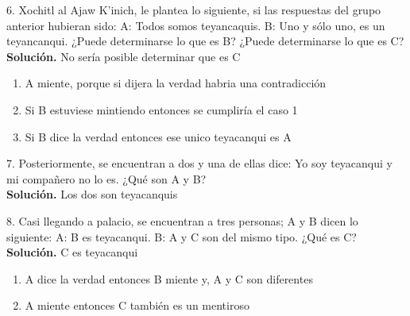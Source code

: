 6. Xochitl al Ajaw K’inich, le plantea lo siguiente, si las respuestas del grupo anterior hubieran sido: A: Todos somos teyancaquis. B: Uno y sólo uno, es un teyancanqui. ¿Puede determinarse lo que es B? ¿Puede determinarse lo que es C?\\

\textbf{Solución.} No sería posible determinar que es C
\begin{enumerate}
    \item A miente, porque si dijera la verdad habria una contradicción
    \item Si B estuviese mintiendo entonces se cumpliría el caso 1
    \item Si B dice la verdad entonces ese unico teyacanqui es A
\end{enumerate}

7. Posteriormente, se encuentran a dos y una de ellas dice: Yo soy teyacanqui y mi compañero no lo es. ¿Qué son A y B? \\

\textbf{Solución.} Los dos son teyacanquis

8. Casi llegando a palacio, se encuentran a tres personas; A y B dicen lo siguiente: A: B es teyacanqui. B: A y C son del mismo tipo. ¿Qué es C?\\
\textbf{Solución.} C es teyacanqui
\begin{enumerate}
    \item A dice la verdad entonces B miente y, A y C son diferentes
    \item A miente entonces C también es un mentiroso
\end{enumerate}